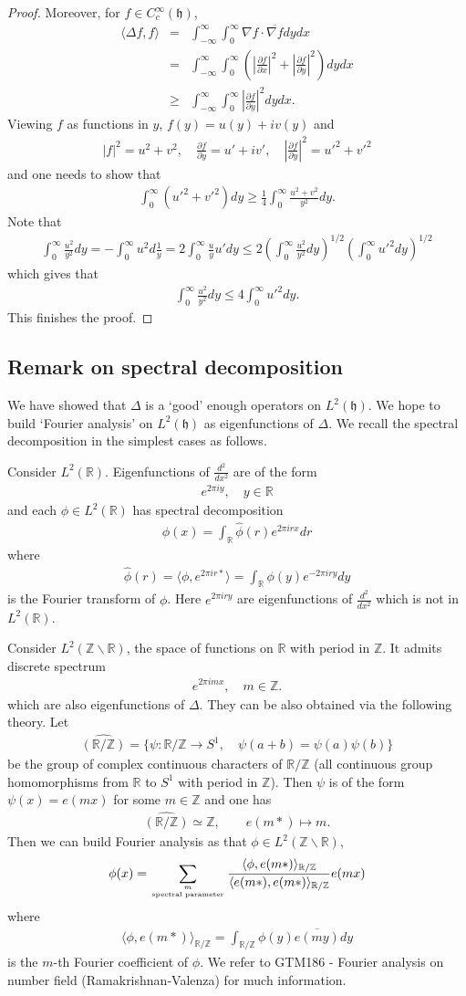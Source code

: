 \documentclass[11pt,reqno]{amsart}
\newcommand{\bna}{\begin{eqnarray*}}
\newcommand{\ena}{\end{eqnarray*}}
\newcommand{\mk}{\mathfrak}
\def\R{\mathbb{R}}
\def\Z{\mathbb{Z}}
\theoremstyle{definition}
\begin{document}
\begin{proof}
Moreover, for $f\in C_c^\infty(\mk h)$,
\bna
\langle \Delta f,f\rangle&=&
\int_{-\infty}^\infty \int_0^\infty
\nabla f\cdot  \overline{\nabla f}dydx\\
&=&
\int_{-\infty}^\infty \int_0^\infty
\left(\left|\frac{\partial f}{\partial x}\right|^2+\left|\frac{\partial f}{\partial y}\right|^2\right)dydx\\
&\geq &
\int_{-\infty}^\infty \int_0^\infty
\left|\frac{\partial f}{\partial y}\right|^2dydx.
\ena
Viewing $f$ as functions in $y$, $f(y)=u(y)+iv(y)$ and
\bna
|f|^2=u^2+v^2,\quad
\frac{\partial f}{\partial y}=
u'+iv',\quad
\left|\frac{\partial f}{\partial y}\right|^2=u'^2+v'^2
\ena
and one needs to show that
\bna
\int_0^\infty (u'^2+v'^2 )dy\geq \frac{1}{4}\int_0^\infty \frac{u^2+v^2}{y^2}dy.
\ena
Note that
\bna
\int_0^\infty \frac{u^2}{y^2}dy=
-\int_0^\infty u^2d\frac{1}{y}
=2\int_0^\infty\frac{u}{y}u'dy\leq 2\left(\int_0^\infty \frac{u^2}{y^2}dy\right)^{1/2}
\left(\int_0^\infty u'^2 dy\right)^{1/2}
\ena
which gives that
\bna
\int_0^\infty\frac{u^2}{y^2}dy\leq 4\int_0^\infty u'^2dy.
\ena
This finishes the proof.
\end{proof}

\subsection{Remark on spectral decomposition}
We have showed that $\Delta$ is a `good' enough  operators on $L^2(\mk h)$.
We hope to build `Fourier analysis' on $L^2(\mk h)$ as eigenfunctions
of $\Delta$.
We recall the spectral decomposition in the simplest cases as follows.

Consider $L^2(\R)$. Eigenfunctions of $\frac{d^2}{dx^2}$
are of the form
\bna
e^{2\pi i y},\quad y\in \R
\ena
and each $\phi\in L^2(\R)$ has spectral decomposition
\bna
\phi(x)=\int_{\R} \widehat\phi(r) e^{2\pi irx}dr
\ena
where
\bna
\widehat\phi(r)=\langle\phi, e^{2\pi ir*}\rangle=\int_{\R}\phi(y) e^{-2\pi iry}dy
\ena
is the Fourier transform of $\phi$.
Here  $e^{2\pi iry}$ are eigenfunctions of $\frac{d^2}{dx^2}$ which is not in $L^2(\R)$.

Consider $L^2(\Z\backslash\R)$, the space of functions on $\R$ with period in $\Z$.
It admits discrete spectrum
\bna
e^{2\pi i mx},\quad m\in \Z.
\ena
which are also eigenfunctions of $\Delta$.
They can be also obtained via the following theory.
Let
\bna
\hat{(\R/\Z)}=\{\psi: \R/\Z\rightarrow S^1,\quad \psi(a+b)=\psi(a)\psi(b)\}
\ena
be the group of complex continuous characters of $\R/\Z$
(all continuous group homomorphisms from $\R$ to $S^1$ with period in $\Z$).
Then $\psi$ is of the form $\psi(x)=e(mx)$ for some $m\in \Z$ and one has
\bna
\hat{(\R/\Z)}\simeq \Z,\qquad  e(m*)\mapsto m.
\ena
Then we can build Fourier analysis as that $\phi\in L^2(\Z\backslash \R)$,
\bna
\phi(x)=\sum_{m\atop{\mbox{\tiny spectral parameter}}}
\frac{\langle\phi,e(m*)\rangle_{\R/\Z}}
{\langle e(m*),e(m*)\rangle_{\R/\Z}}
 e(m x)
\ena
where
\bna
\langle\phi,e(m*)\rangle_{\R/\Z}=\int_{\R/\Z}\phi(y) \overline{e(my)}dy
\ena
is the $m$-th Fourier coefficient of $\phi$.
We refer to GTM186 - Fourier analysis on number field (Ramakrishnan-Valenza)
for much information.
\end{document}
